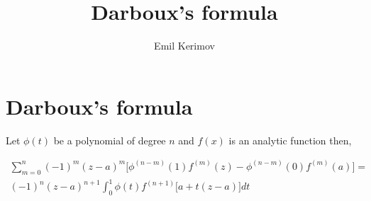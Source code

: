 \documentclass[a4paper]{article}
\title{Darboux's formula}
\author{Emil Kerimov}
\date{}
\begin{document}
\maketitle

\section{Darboux's formula}\label{dar:sec:darboux}

Let $\phi(t)$ be a polynomial of degree $n$ and $f(x)$ is an analytic function then,

\begin{theorem}\label{dar:thm:darboux}
    \begin{multline}
        \sum_{m=0}^{n} (-1)^m (z-a)^m \Big[ \phi^{(n-m)}(1) f^{(m)}(z)  - \phi^{(n-m)}(0) f^{(m)}(a) \Big]
        =
        \\
        (-1)^n (z-a)^{n+1} \int_{0}^{1} \phi(t) f^{(n+1)}\Big[a + t(z-a)\Big] dt
    \end{multline}


\end{theorem}
\end{document}
